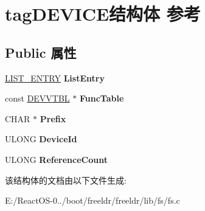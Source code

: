 \hypertarget{structtag_d_e_v_i_c_e}{}\section{tag\+D\+E\+V\+I\+C\+E结构体 参考}
\label{structtag_d_e_v_i_c_e}
\subsection*{Public 属性}
\begin{DoxyCompactItemize}
\item 
\mbox{\label{structtag_d_e_v_i_c_e_a842fdece214de9e9f1bf18eba6fc38f4}} 
\hyperlink{struct___l_i_s_t___e_n_t_r_y}{L\+I\+S\+T\+\_\+\+E\+N\+T\+RY} {\bfseries List\+Entry}
\item 
\mbox{\label{structtag_d_e_v_i_c_e_a40c1699ba2e5c402a7e9177874032188}} 
const \hyperlink{structtag_d_e_v_v_t_b_l}{D\+E\+V\+V\+T\+BL} $\ast$ {\bfseries Func\+Table}
\item 
\mbox{\label{structtag_d_e_v_i_c_e_a7539d665aa58a8d38cc868ee9a5e2a42}} 
C\+H\+AR $\ast$ {\bfseries Prefix}
\item 
\mbox{\label{structtag_d_e_v_i_c_e_a377d14ba47ebc43fe4c283979ae541f6}} 
U\+L\+O\+NG {\bfseries Device\+Id}
\item 
\mbox{\label{structtag_d_e_v_i_c_e_aa4c435ec6aff67f4ce08ac2404e1cf9b}} 
U\+L\+O\+NG {\bfseries Reference\+Count}
\end{DoxyCompactItemize}


该结构体的文档由以下文件生成\+:\begin{DoxyCompactItemize}
\item 
E\+:/\+React\+O\+S-\/0../boot/freeldr/freeldr/lib/fs/fs.\+c\end{DoxyCompactItemize}
